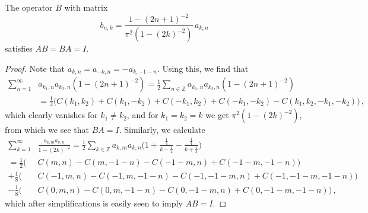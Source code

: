 \documentclass[10pt,a4paper]{amsart}
\newcommand{\Z}{\mathbb{Z}}
\begin{document}
\begin{proposition} %
The operator $B$ with matrix
	\[b_{n,k} =  \frac{1-(2n+1)^{-2}}{\pi^2(1-(2k)^{-2})}\, a_{k,n}\]
satisfies $AB=BA=I$.
\end{proposition}

\begin{proof}
	Note that $a_{k,n}=a_{-k,n}=-a_{k,-1-n}$. Using this, we find that
	\begin{align*}
	\sum_{n=1}^{\infty}&a_{k_1,n}a_{k_2,n}(1-(2n+1)^{-2}) =
	\frac12\sum_{n\in\Z}a_{k_1,n}a_{k_2,n}(1-(2n+1)^{-2})\\
	&=\frac12\Big(C(k_1,k_2)+C(k_1,-k_2)+C(-k_1,k_2)+C(-k_1,-k_2)-C(k_1,k_2,-k_1,-k_2)\Big)\,,
	\end{align*}
	which clearly vanishes for $k_1\ne k_2$, and for $k_1=k_2=k$ we get
	$\pi^2(1-(2k)^{-2})$, from which we see that $BA=I$. Similarly, we calculate 
	\begin{align*}
	\sum_{k=1}^{\infty}&\frac{a_{k,m}a_{k,n}}{1-(2k)^{-2}} =
	\frac12\sum_{k\in\Z}a_{k,m}a_{k,n}\Big(1+\frac{\frac14}{k-\frac12}-\frac{\frac14}{k+\frac12}\Big)\\
	=\frac12\Big(&C(m,n)-C(m,-1{-}n)-C(-1{-}m,n)+C(-1{-}m,-1{-}n)\Big)\\
	+\frac18\Big(&C(-1,m,n)-C(-1,m,-1{-}n)-C(-1,-1{-}m,n)+C(-1,-1{-}m,-1{-}n)\Big)\\
	-\frac18\Big(&C(0,m,n)-C(0,m,-1{-}n)-C(0,-1{-}m,n)+C(0,-1{-}m,-1{-}n)\Big)\,,
	\end{align*}
	which after simplifications is easily seen to imply $AB=I$.
\end{proof}
\end{document}
